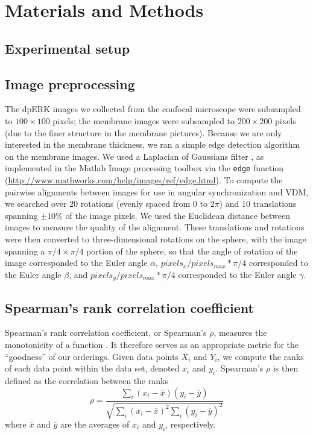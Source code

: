 \documentclass[10pt]{article}
\begin{document}
\section*{Materials and Methods}

\subsection*{Experimental setup}

\subsection*{Image preprocessing}
The dpERK images we collected from the confocal microscope were subsampled to $100 \times 100$ pixels; 
the membrane images were subsampled to $200 \times 200$ pixels (due to the finer structure in the membrane pictures). 
%
Because we are only interested in the membrane thickness, we ran a simple edge detection algorithm on the membrane images.
%
We used a Laplacian of Gaussians filter \cite{canny1986computational}, as implemented in the Matlab Image processing toolbox via the \texttt{edge} function (\url{http://www.mathworks.com/help/images/ref/edge.html}).
%
To compute the pairwise alignments between images for use in angular synchronization and VDM, we searched over 20 rotations (evenly spaced from $0$ to $2 \pi$) and 10 translations spanning $\pm 10 \%$ of the image pixels.
%
We used the Euclidean distance between images to measure the quality of the alignment.
%
These translations and rotations were then converted to three-dimensional rotations on the sphere, with the image spanning a $\pi/4 \times \pi/4$ portion of the sphere, so that the angle of rotation of the image corresponded to the Euler angle $\alpha$, $pixels_x/pixels_{max} * \pi/4$ corresponded to the Euler angle $\beta$, and  $pixels_y/pixels_{max} * \pi/4$ corresponded to the Euler angle $\gamma$.

\subsection*{Spearman's rank correlation coefficient}

Spearman's rank correlation coefficient, or Spearman's $\rho$, measures the monotonicity of a function \cite{myers2010research}. 
%
It therefore serves as an appropriate metric for the ``goodness'' of our orderings.
%
Given data points $X_i$ and $Y_i$, we compute the ranks of each data point within the data set, denoted $x_i$ and $y_i$.
%
Spearman's $\rho$ is then defined as the correlation between the ranks
\begin{equation}
\rho = \frac{\sum_i (x_i - \overline{x})(y_i - \overline{y})}{\sqrt{\sum_i (x_i - \overline{x})^2 \sum_i (y_i - \overline{y})^2}}
\end{equation}
where $\overline{x}$ and $\overline{y}$ are the averages of $x_i$ and $y_i$, respectively. 
\end{document}
